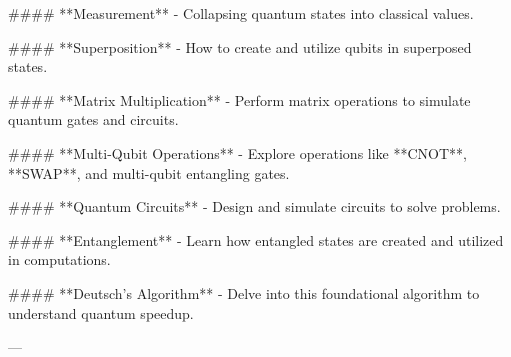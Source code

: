 #### **Measurement**
- Collapsing quantum states into classical values.

#### **Superposition**
- How to create and utilize qubits in superposed states.

#### **Matrix Multiplication**
- Perform matrix operations to simulate quantum gates and circuits.

#### **Multi-Qubit Operations**
- Explore operations like **CNOT**, **SWAP**, and multi-qubit entangling gates.

#### **Quantum Circuits**
- Design and simulate circuits to solve problems.

#### **Entanglement**
- Learn how entangled states are created and utilized in computations.

#### **Deutsch’s Algorithm**
- Delve into this foundational algorithm to understand quantum speedup.

--- 
